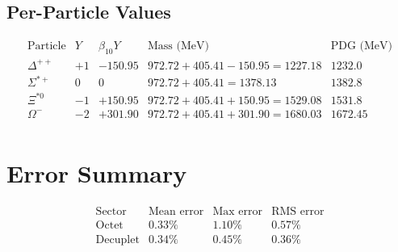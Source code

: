 \subsection{Per-Particle Values}

\[
\begin{array}{ccccc}
\text{Particle} & Y & \beta_{10} Y & \text{Mass (MeV)} & \text{PDG (MeV)} \\
\hline
\Delta^{++} & +1 & -150.95 & 972.72{+}405.41{-}150.95 = 1227.18 & 1232.0 \\
\Sigma^{*+} & 0 & 0 & 972.72{+}405.41 = 1378.13 & 1382.8 \\
\Xi^{*0} & -1 & +150.95 & 972.72{+}405.41{+}150.95 = 1529.08 & 1531.8 \\
\Omega^- & -2 & +301.90 & 972.72{+}405.41{+}301.90 = 1680.03 & 1672.45 \\
\end{array}
\]

\section{Error Summary}

\[
\begin{array}{lccc}
\text{Sector} & \text{Mean error} & \text{Max error} & \text{RMS error} \\
\hline
\text{Octet} & 0.33\% & 1.10\% & 0.57\% \\
\text{Decuplet} & 0.34\% & 0.45\% & 0.36\% \\
\end{array}
\]
